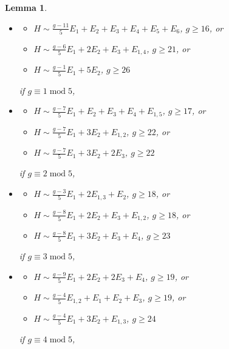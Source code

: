 \documentclass[11pt]{amsart}
\newtheorem{lemma}[thm]{Lemma}
\theoremstyle{definition}
\begin{document}
\begin{lemma}
\begin{itemize}
\item
  \begin{itemize}
  \item []$H \sim \frac{g-11}{5}E_1+E_2+E_3+E_4+E_5+E_6$, $ g \geqslant 16$, or 
  \item []$H \sim \frac{g-6}{5}E_1+2E_2+E_3+E_{1,4}$, $ g \geqslant 21$,
 or
\item []$H \sim \frac{g-1}{5}E_1+5E_2$, $ g \geqslant 26$
  \end{itemize}
if $g \equiv 1 \; \mbox{mod} \; 5$,

\item
  \begin{itemize}
  \item []$H \sim \frac{g-7}{5}E_1+E_2+E_3+E_4+E_{1,5}$, $ g \geqslant 17$, or 
  \item []$H \sim \frac{g-7}{5}E_1+3E_2+E_{1,2}$, $ g \geqslant 22$, or
\item []$H \sim \frac{g-7}{5}E_1+3E_2+2E_3$, $ g \geqslant 22$
  \end{itemize}
if $g \equiv 2 \; \mbox{mod} \; 5$,

\item
  \begin{itemize}
  \item []$H \sim \frac{g-3}{5}E_{1}+2E_{1,3}+E_2$, $ g \geqslant 18$, or 
  \item []$H \sim \frac{g-8}{5}E_1+2E_2+E_3+E_{1,2}$, $ g \geqslant 18$, or
\item []$H \sim \frac{g-8}{5}E_1+3E_2+E_3+E_4$, $ g \geqslant 23$
  \end{itemize}
if $g \equiv 3 \; \mbox{mod} \; 5$,

\item
  \begin{itemize}
  \item []$H \sim \frac{g-9}{5}E_{1}+2E_2+2E_3+E_4$, $ g \geqslant 19$, or 
  \item []$H \sim \frac{g-4}{5}E_{1,2}+E_1+E_2+E_3$, $ g \geqslant 19$,  or
\item []$H \sim \frac{g-4}{5}E_1+3E_2+E_{1,3}$, $ g \geqslant 24$
  \end{itemize}
if $g \equiv 4 \; \mbox{mod} \; 5$,
\end{itemize}
\end{lemma}
\end{document}
